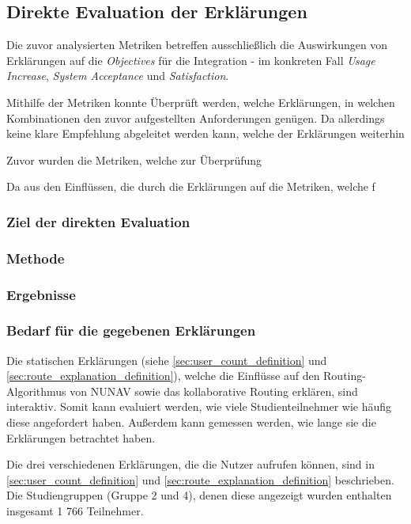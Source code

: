\subsection{Direkte Evaluation der Erklärungen}
\label{sec:study_results_qualitativ}

Die zuvor analysierten Metriken betreffen ausschließlich die Auswirkungen von Erklärungen auf die \textit{Objectives} für die Integration - im konkreten Fall \textit{Usage Increase}, \textit{System Acceptance} und \textit{Satisfaction}.

Mithilfe der Metriken konnte Überprüft werden, welche Erklärungen, in welchen Kombinationen den zuvor aufgestellten Anforderungen genügen. Da allerdings keine klare Empfehlung abgeleitet werden kann, welche der Erklärungen weiterhin 

Zuvor wurden die Metriken, welche zur Überprüfung 

Da aus den Einflüssen, die durch die Erklärungen auf die Metriken, welche f

\subsubsection{Ziel der direkten Evaluation}

\subsubsection{Methode}

\subsubsection{Ergebnisse}

\subsubsection{Bedarf für die gegebenen Erklärungen}

Die statischen Erklärungen (siehe \autoref{sec:user_count_definition} und \autoref{sec:route_explanation_definition}), welche die Einflüsse auf den Routing-Algorithmus von NUNAV sowie das kollaborative Routing erklären, sind interaktiv. Somit kann evaluiert werden, wie viele Studienteilnehmer wie häufig diese angefordert haben. Außerdem kann gemessen werden, wie lange sie die Erklärungen betrachtet haben.

Die drei verschiedenen Erklärungen, die die Nutzer aufrufen können, sind in \autoref{sec:user_count_definition} und \autoref{sec:route_explanation_definition} beschrieben. Die Studiengruppen (Gruppe 2 und 4), denen diese angezeigt wurden enthalten insgesamt 1 766 Teilnehmer.

